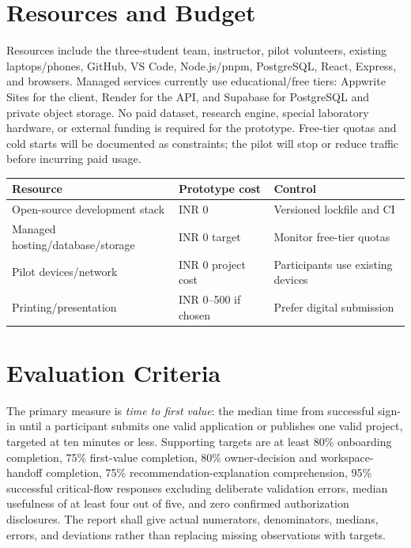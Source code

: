 \documentclass[11pt,a4paper]{article}
\begin{document}
\section{Resources and Budget}

Resources include the three-student team, instructor, pilot volunteers, existing laptops/phones, GitHub, VS Code, Node.js/pnpm, PostgreSQL, React, Express, and browsers. Managed services currently use educational/free tiers: Appwrite Sites for the client, Render for the API, and Supabase for PostgreSQL and private object storage. No paid dataset, research engine, special laboratory hardware, or external funding is required for the prototype. Free-tier quotas and cold starts will be documented as constraints; the pilot will stop or reduce traffic before incurring paid usage.

\begin{center}
\begin{tabular}{lll}
\toprule
Resource & Prototype cost & Control \\
\midrule
Open-source development stack & INR 0 & Versioned lockfile and CI \\
Managed hosting/database/storage & INR 0 target & Monitor free-tier quotas \\
Pilot devices/network & INR 0 project cost & Participants use existing devices \\
Printing/presentation & INR 0--500 if chosen & Prefer digital submission \\
\bottomrule
\end{tabular}
\end{center}

\section{Evaluation Criteria}

The primary measure is \emph{time to first value}: the median time from successful sign-in until a participant submits one valid application or publishes one valid project, targeted at ten minutes or less. Supporting targets are at least 80\% onboarding completion, 75\% first-value completion, 80\% owner-decision and workspace-handoff completion, 75\% recommendation-explanation comprehension, 95\% successful critical-flow responses excluding deliberate validation errors, median usefulness of at least four out of five, and zero confirmed authorization disclosures. The report shall give actual numerators, denominators, medians, errors, and deviations rather than replacing missing observations with targets.
\end{document}

